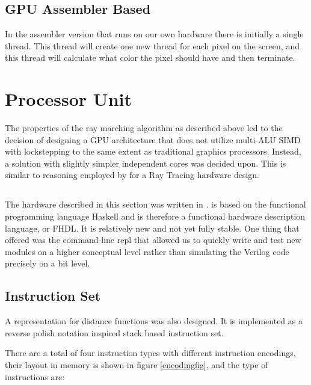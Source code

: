 		\subsection{GPU Assembler Based}

			In the assembler version that runs on our own hardware there is
			initially a single thread. This thread will create one new thread
			for each pixel on the screen, and this thread will calculate what 
			color the pixel should have and then terminate. 


	\section{Processor Unit} \label{implproc}

		The properties of the ray marching algorithm as described above led to
		the decision of designing a GPU architecture that does not utilize
		multi-ALU SIMD with lockstepping to the same extent as traditional
		graphics processors. Instead, a solution with slightly simpler
		independent cores was decided upon. This is similar to reasoning
		employed by \cite{Woop2005} for a Ray Tracing hardware design.

		\subsection{\clash}

			The hardware described in this section was written in \clash. \clash is
			based on the functional programming language Haskell and is therefore a
			functional hardware description language, or FHDL. It is relatively new
			and not yet fully stable. One thing that \clash offered was the
			command-line repl that allowed us to quickly write and test new modules
			on a higher conceptual level rather than simulating the Verilog code
			precisely on a bit level.

		\subsection{Instruction Set}

			A representation for distance functions was also designed. It is
			implemented as a reverse polish notation inspired stack based 
			instruction set.

			There are a total of four instruction types with different
			instruction encodings, their layout in memory is shown in figure
			\ref{encodingfig}, and the type of instructions are:

